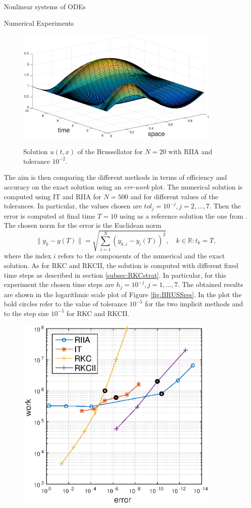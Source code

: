 \documentclass{article}
\begin{document}
\begin{section}{Nonlinear systems of ODEs}
\begin{subsection}{Numerical Experiments}
\begin{figure}[t!]
\centering
\includegraphics [width=4in]{Pictures/BRUSSNICE.eps}\\
\caption{Solution $u(t,x)$ of the Brussellator for $N = 20$ with RIIA and tolerance $10^{-2}$.}
\label{fig:BRUSSsol}
\end{figure}
The aim is then comparing the different methods in terms of efficiency and accuracy on the exact solution using an \textit{err-work} plot. The numerical solution is computed using IT and RIIA for $N = 500$ and for different values of the tolerances. In particular, the values chosen are $tol_j = 10^{-j}, j = 2,\dots,7$. Then the error is computed at final time $T = 10$ using as a reference solution the one from \cite{JC}. The chosen norm for the error is the Euclidean norm
\begin{equation}\label{eq:err}
	\|y_{k} - y(T)\| = \sqrt{\sum_{i = 1}^N(y_{k,i} - y_i(T))^2}, \quad k \in \mathbb{R} \colon t_k = T,
\end{equation}
where the index $i$ refers to the components of the numerical and the exact solution. As for RKC and RKCII, the solution is computed with different fixed time steps as described in section \ref{subsec:RKCstrat}. In particular, for this experiment the chosen time steps are $h_j = 10^{-j}, j = 1,\dots,7$. The obtained results are shown in the logarithmic scale plot of Figure \ref{fig:BRUSSres}. In the plot the bold circles refer to the value of tolerance $10^{-5}$ for the two implicit methods and to the step size $10^{-5}$ for RKC and RKCII.
\begin{figure}[t!]
\centering
\includegraphics [width=4in]{Pictures/BRUSSresults.eps}

\end{figure}
\end{subsection}
\end{section}
\end{document}
